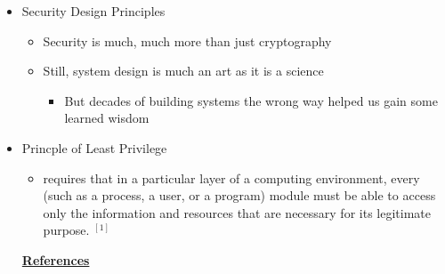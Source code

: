 \documentclass[12pt]{article}
\begin{document}
\begin{itemize}
    \item Security Design Principles
    \begin{itemize}
        \item Security is much, much more than just cryptography
        \item Still, system design is much an art as it is a science
        \begin{itemize}
            \item But decades of building systems the wrong way helped us
            gain some learned wisdom
        \end{itemize}
    \end{itemize}

    \item Princple of Least Privilege
    \begin{itemize}
        \item requires that in a particular layer of a computing environment, every
        (such as a process, a user, or a program) module must be able to access only
        the information and resources that are necessary for its legitimate purpose. $^{[1]}$
    \end{itemize}

    \bigskip

    \underline{\textbf{References}}

    \bigskip


\end{itemize}
\end{document}
